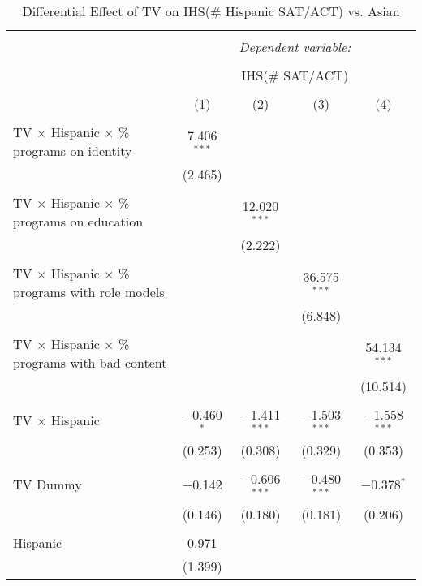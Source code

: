 
\begin{table}[!htbp] \centering 
  \caption{Differential Effect of TV on IHS(\# Hispanic SAT/ACT) vs. Asian} 
  \label{} 
\begin{tabular}{@{\extracolsep{-2pt}}lcccc} 
\\[-1.8ex]\hline 
\hline \\[-1.8ex] 
 & \multicolumn{4}{c}{\textit{Dependent variable:}} \\ 
\cline{2-5} 
\\[-1.8ex] & \multicolumn{4}{c}{IHS(\# SAT/ACT)} \\ 
\\[-1.8ex] & (1) & (2) & (3) & (4)\\ 
\hline \\[-1.8ex] 
 TV $\times$ Hispanic $\times$ \% programs on identity & 7.406$^{***}$ &  &  &  \\ 
  & (2.465) &  &  &  \\ 
  & & & & \\ 
 TV $\times$ Hispanic $\times$ \% programs on education &  & 12.020$^{***}$ &  &  \\ 
  &  & (2.222) &  &  \\ 
  & & & & \\ 
 TV $\times$ Hispanic $\times$ \% programs with role models &  &  & 36.575$^{***}$ &  \\ 
  &  &  & (6.848) &  \\ 
  & & & & \\ 
 TV $\times$ Hispanic $\times$ \% programs with bad content &  &  &  & 54.134$^{***}$ \\ 
  &  &  &  & (10.514) \\ 
  & & & & \\ 
 TV $\times$ Hispanic & $-$0.460$^{*}$ & $-$1.411$^{***}$ & $-$1.503$^{***}$ & $-$1.558$^{***}$ \\ 
  & (0.253) & (0.308) & (0.329) & (0.353) \\ 
  & & & & \\ 
 TV Dummy & $-$0.142 & $-$0.606$^{***}$ & $-$0.480$^{***}$ & $-$0.378$^{*}$ \\ 
  & (0.146) & (0.180) & (0.181) & (0.206) \\ 
  & & & & \\ 
 Hispanic & 0.971 &  &  &  \\ 
  & (1.399) &  &  &  \\ 

\end{tabular}
\end{table}
